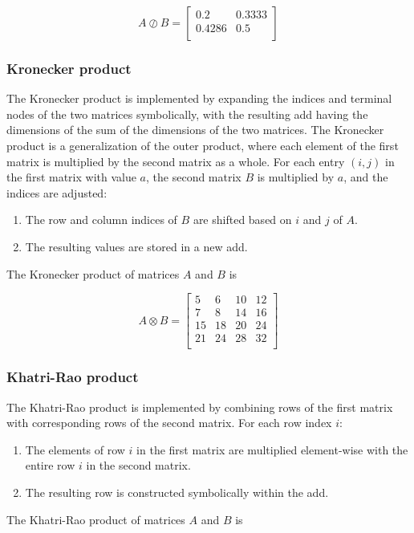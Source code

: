 \[
    A \oslash B = \begin{bmatrix}
        0.2    & 0.3333 \\
        0.4286 & 0.5    \\
    \end{bmatrix}
\]

\subsubsection{Kronecker product}
The Kronecker product is implemented by expanding the indices and terminal nodes of the two matrices symbolically, with the resulting \gls{add} having the dimensions of the sum of the dimensions of the two matrices. 
The Kronecker product is a generalization of the outer product, where each element of the first matrix is multiplied by the second matrix as a whole.
For each entry $(i, j)$ in the first matrix with value $a$, the second matrix $B$ is multiplied by $a$, and the indices are adjusted:
\begin{enumerate}
    \item The row and column indices of $B$ are shifted based on $i$ and $j$ of $A$.
    \item The resulting values are stored in a new \gls{add}.
\end{enumerate}
The Kronecker product of matrices $A$ and $B$ is

\[
    A \otimes B = \begin{bmatrix}
        5  & 6  & 10 & 12 \\
        7  & 8  & 14 & 16 \\
        15 & 18 & 20 & 24 \\
        21 & 24 & 28 & 32 \\
    \end{bmatrix}
\]

\subsubsection{Khatri-Rao product}
The Khatri-Rao product is implemented by combining rows of the first matrix with corresponding rows of the second matrix. For each row index $i$:
\begin{enumerate}
    \item The elements of row $i$ in the first matrix are multiplied element-wise with the entire row $i$ in the second matrix.
    \item The resulting row is constructed symbolically within the \gls{add}.   
\end{enumerate}
The Khatri-Rao product of matrices $A$ and $B$ is

